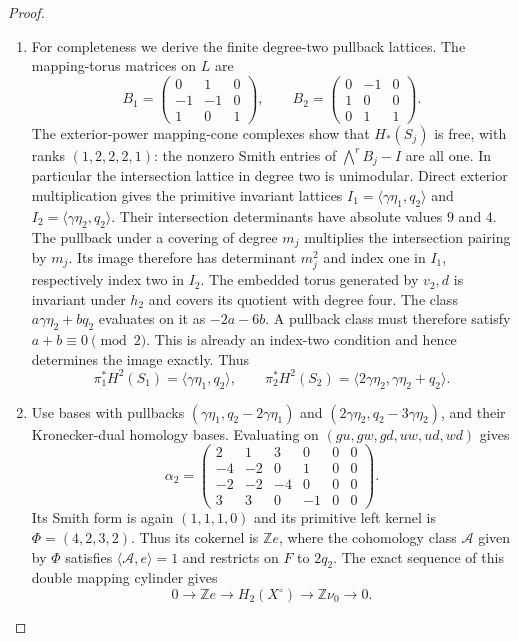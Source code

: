 \begin{proof}
\begin{enumerate}[label=\arabic*.,leftmargin=*]
\item For completeness we derive the finite degree-two
pullback lattices.  The mapping-torus matrices on
$L$ are
\[
 B_1=\begin{pmatrix}0&1&0\\-1&-1&0\\1&0&1\end{pmatrix},
 \qquad
 B_2=\begin{pmatrix}0&-1&0\\1&0&0\\0&1&1\end{pmatrix}.
\]
The exterior-power mapping-cone complexes show that
$H_*(S_j)$ is free, with ranks $(1,2,2,2,1)$:
the nonzero Smith entries of
$\bigwedge^r B_j-I$ are all one.  In particular the
intersection lattice in degree two is unimodular.
Direct exterior multiplication gives the primitive
invariant lattices
$I_1=\langle\gamma\eta_1,q_2\rangle$ and
$I_2=\langle\gamma\eta_2,q_2\rangle$.
Their intersection determinants have absolute values
$9$ and $4$.  The pullback under a covering of degree
$m_j$ multiplies the intersection pairing by $m_j$.
Its image therefore has determinant $m_j^2$ and index
one in $I_1$, respectively index two in $I_2$.
The embedded torus generated by $v_2,d$ is invariant
under $h_2$ and covers its quotient with degree four.
The class $a\gamma\eta_2+bq_2$ evaluates on it as
$-2a-6b$.  A pullback class must therefore satisfy
$a+b\equiv0\pmod2$.  This is already an index-two
condition and hence determines the image exactly.
Thus
\[
 \pi_1^*H^2(S_1)=\langle\gamma\eta_1,q_2\rangle,
 \qquad
 \pi_2^*H^2(S_2)=\langle2\gamma\eta_2,
                                  \gamma\eta_2+q_2\rangle.
 \tag{B.5.13}\label{maps:eq:B.5.13}
\]

\item Use bases with pullbacks
$(\gamma\eta_1,q_2-2\gamma\eta_1)$ and
$(2\gamma\eta_2,q_2-3\gamma\eta_2)$, and their
Kronecker-dual homology bases.  Evaluating on
$(gu,gw,gd,uw,ud,wd)$ gives
\[
 \alpha_2=
 \begin{pmatrix}
 2&1&3&0&0&0\\-4&-2&0&1&0&0\\
 -2&-2&-4&0&0&0\\3&3&0&-1&0&0
 \end{pmatrix}.
 \tag{B.5.14}\label{maps:eq:B.5.14}
\]
Its Smith form is again $(1,1,1,0)$ and its primitive
left kernel is $\Phi=(4,2,3,2)$.  Thus its cokernel is
$\mathbb Z e$, where the cohomology class $\mathcal A$
given by $\Phi$ satisfies
$\langle\mathcal A,e\rangle=1$ and restricts on $F$
to $2q_2$.  The exact sequence of this double mapping
cylinder gives
\[
 0\longrightarrow\mathbb Z e\longrightarrow
 H_2(X^\circ)\longrightarrow\mathbb Z\nu_0
 \longrightarrow0.
 \tag{B.5.15}\label{maps:eq:B.5.15}
\]


\end{enumerate}
\end{proof}
